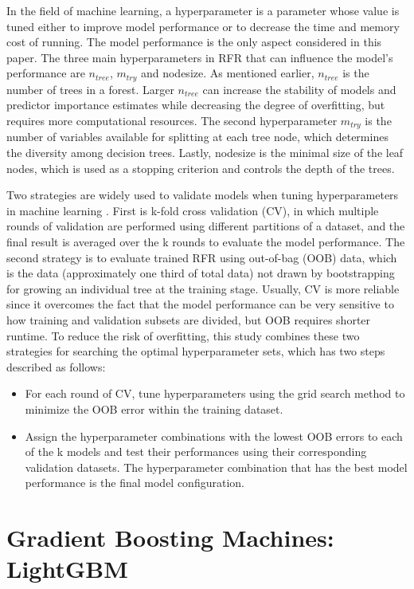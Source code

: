 In the field of machine learning, a hyperparameter is a parameter whose value is tuned either to
improve model performance or to decrease the time and memory cost of running. The model
performance is the only aspect considered in this paper. The three main hyperparameters in RFR that
can influence the model’s performance are $n_{tree}$, $m_{try}$ and nodesize. As mentioned earlier, $n_{tree}$ is the
number of trees in a forest. Larger $n_{tree}$ can increase the stability of models and predictor importance estimates while decreasing the degree of overfitting, but requires more computational resources.
The second hyperparameter $m_{try}$ is the number of variables available for splitting at each tree node,
which determines the diversity among decision trees. Lastly, nodesize is the minimal size of the leaf
nodes, which is used as a stopping criterion and controls the depth of the trees. 
\par Two strategies are widely used to validate models when tuning hyperparameters in machine
learning \cite{sathyadevan2015comparative}. First is k-fold cross validation (CV), in which multiple rounds of validation are performed
using different partitions of a dataset, and the final result is averaged over the k rounds to evaluate
the model performance. The second strategy is to evaluate trained RFR using out-of-bag (OOB) data,
which is the data (approximately one third of total data) not drawn by bootstrapping for growing an
individual tree at the training stage. Usually, CV is more reliable since it overcomes the fact that the
model performance can be very sensitive to how training and validation subsets are divided, but OOB
requires shorter runtime. To reduce the risk of overfitting, this study combines these two strategies for
searching the optimal hyperparameter sets, which has two steps described as follows:
\begin{itemize}
    \item For each round of CV, tune hyperparameters using the grid search method to minimize the OOB
error within the training dataset.
    \item Assign the hyperparameter combinations with the lowest OOB errors to each of the k models
and test their performances using their corresponding validation datasets. The hyperparameter
combination that has the best model performance is the final model configuration.
\end{itemize}

\chapter{Gradient Boosting Machines: LightGBM}
